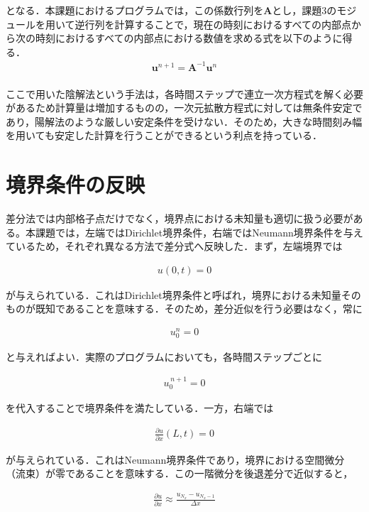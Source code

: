 \documentclass[dvipdfmx]{jsarticle}
\begin{document}
となる．本課題におけるプログラムでは，この係数行列を$\boldsymbol{A}$とし，課題3のモジュールを用いて逆行列を計算することで，現在の時刻におけるすべての内部点から次の時刻におけるすべての内部点における数値を求める式を以下のように得る．
\begin{align}
  \boldsymbol{u}^{n+1} = \boldsymbol{A}^{-1} \boldsymbol{u}^n
\end{align}\\

ここで用いた陰解法という手法は，各時間ステップで連立一次方程式を解く必要があるため計算量は増加するものの，一次元拡散方程式に対しては無条件安定であり，陽解法のような厳しい安定条件を受けない．そのため，大きな時間刻み幅を用いても安定した計算を行うことができるという利点を持っている．

\section{境界条件の反映}

差分法では内部格子点だけでなく，境界点における未知量も適切に扱う必要がある。本課題では，左端ではDirichlet境界条件，右端ではNeumann境界条件を与えているため，それぞれ異なる方法で差分式へ反映した．まず，左端境界では

\begin{align}
  u(0,t)=0
\end{align}

が与えられている．これはDirichlet境界条件と呼ばれ，境界における未知量そのものが既知であることを意味する．そのため，差分近似を行う必要はなく，常に

\begin{align}
  u_0^n=0
\end{align}

と与えればよい．実際のプログラムにおいても，各時間ステップごとに

\begin{align}
  u_0^{\,n+1}=0
\end{align}

を代入することで境界条件を満たしている．一方，右端では

\begin{align}
  \frac{\partial u}{\partial x}(L,t)=0
\end{align}

が与えられている．これはNeumann境界条件であり，境界における空間微分（流束）が零であることを意味する．この一階微分を後退差分で近似すると，

\begin{align}
  \frac{\partial u}{\partial x}
  \approx
  \frac{u_{N_x}-u_{N_x-1}}
  {\Delta x}
\end{align}
\end{document}
